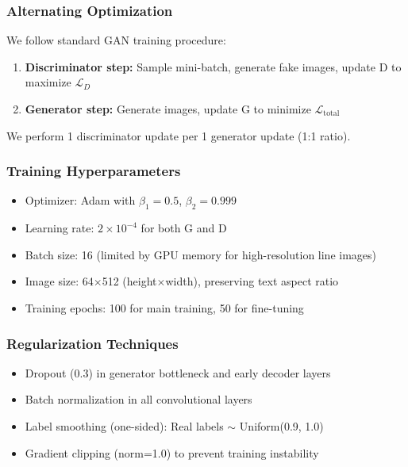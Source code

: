 \documentclass[journal]{IEEEtran}
\begin{document}
\subsubsection{Alternating Optimization}

We follow standard GAN training procedure:
\begin{enumerate}
    \item \textbf{Discriminator step:} Sample mini-batch, generate fake images, update D to maximize $\mathcal{L}_D$
    \item \textbf{Generator step:} Generate images, update G to minimize $\mathcal{L}_{\text{total}}$
\end{enumerate}

We perform 1 discriminator update per 1 generator update (1:1 ratio).

\subsubsection{Training Hyperparameters}

\begin{itemize}
    \item Optimizer: Adam with $\beta_1=0.5$, $\beta_2=0.999$
    \item Learning rate: $2 \times 10^{-4}$ for both G and D
    \item Batch size: 16 (limited by GPU memory for high-resolution line images)
    \item Image size: 64$\times$512 (height$\times$width), preserving text aspect ratio
    \item Training epochs: 100 for main training, 50 for fine-tuning
\end{itemize}

\subsubsection{Regularization Techniques}

\begin{itemize}
    \item Dropout (0.3) in generator bottleneck and early decoder layers
    \item Batch normalization in all convolutional layers
    \item Label smoothing (one-sided): Real labels $\sim$ Uniform(0.9, 1.0)
    \item Gradient clipping (norm=1.0) to prevent training instability
\end{itemize}
\end{document}
